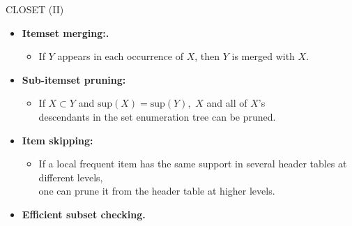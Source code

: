 \begin{frame}{CLOSET (II)}
	\begin{itemize}
		\item \textbf{Itemset merging:.}
		      \begin{itemize}
			      \item If $Y$ appears in each occurrence of $X$, then $Y$ is merged
			            with $X$.
		      \end{itemize}
		\item \textbf{Sub-itemset pruning:}
		      \begin{itemize}
			      \item If $X \subset Y$ and $\text{sup}(X) = \text{sup}(Y),$ $X$ and
			            all of $X$'s\\
			            descendants in the set enumeration tree can be pruned.
		      \end{itemize}
		\item \textbf{Item skipping:}
		      \begin{itemize}
			      \item If a local frequent item has the same support in several
			            header tables at different levels, \\
			            one can prune it from the header table at higher levels.
		      \end{itemize}
		\item \textbf{Efficient subset checking.}
	\end{itemize}
\end{frame}

